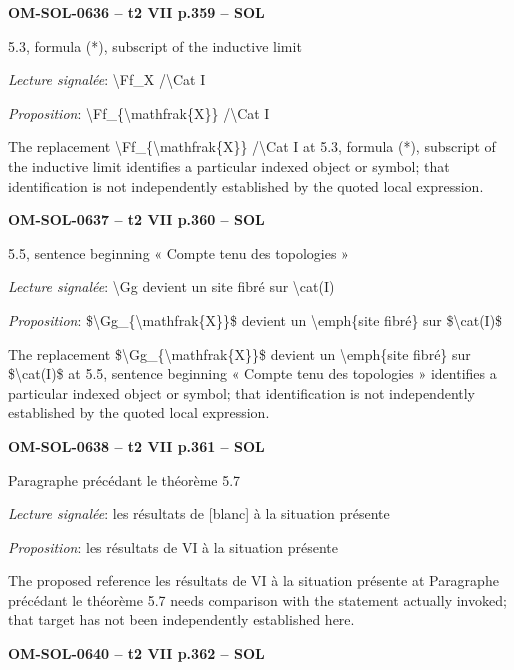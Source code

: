 \par\noindent\textbf{OM-SOL-0636 -- t2 VII p.359 -- SOL}\par
5.3, formula (*), subscript of the inductive limit\par
\emph{Lecture signalée}: \textbackslash{}Ff\_X /\textbackslash{}Cat I\par
\emph{Proposition}: \textbackslash{}Ff\_\{\textbackslash{}mathfrak\{X\}\} /\textbackslash{}Cat I\par
The replacement \textbackslash{}Ff\_\{\textbackslash{}mathfrak\{X\}\} /\textbackslash{}Cat I at 5.3, formula (*), subscript of the inductive limit identifies a particular indexed object or symbol; that identification is not independently established by the quoted local expression.\par
\par\noindent\textbf{OM-SOL-0637 -- t2 VII p.360 -- SOL}\par
5.5, sentence beginning « Compte tenu des topologies »\par
\emph{Lecture signalée}: \textbackslash{}Gg devient un site fibré sur \textbackslash{}cat(I)\par
\emph{Proposition}: \$\textbackslash{}Gg\_\{\textbackslash{}mathfrak\{X\}\}\$ devient un \textbackslash{}emph\{site fibré\} sur \$\textbackslash{}cat(I)\$\par
The replacement \$\textbackslash{}Gg\_\{\textbackslash{}mathfrak\{X\}\}\$ devient un \textbackslash{}emph\{site fibré\} sur \$\textbackslash{}cat(I)\$ at 5.5, sentence beginning « Compte tenu des topologies » identifies a particular indexed object or symbol; that identification is not independently established by the quoted local expression.\par
\par\noindent\textbf{OM-SOL-0638 -- t2 VII p.361 -- SOL}\par
Paragraphe précédant le théorème 5.7\par
\emph{Lecture signalée}: les résultats de [blanc] à la situation présente\par
\emph{Proposition}: les résultats de VI à la situation présente\par
The proposed reference les résultats de VI à la situation présente at Paragraphe précédant le théorème 5.7 needs comparison with the statement actually invoked; that target has not been independently established here.\par
\par\noindent\textbf{OM-SOL-0640 -- t2 VII p.362 -- SOL}\par
